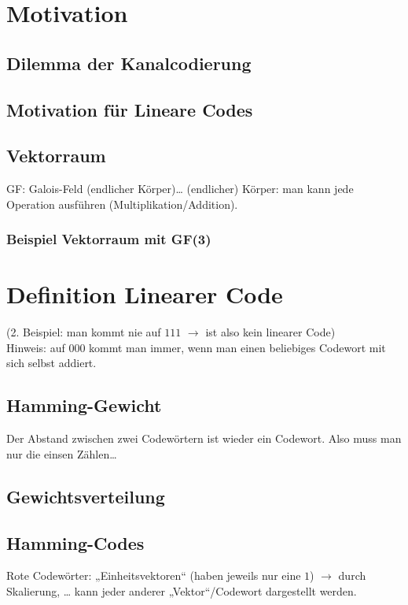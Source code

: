 \section{Motivation}
\subsection{Dilemma der Kanalcodierung}
\subsection{Motivation für Lineare Codes}
\subsection{Vektorraum}
GF: Galois-Feld (endlicher Körper)… (endlicher) Körper: man kann jede Operation ausführen (Multiplikation/Addition).
\subsubsection*{Beispiel Vektorraum mit GF(3)}

\section{Definition Linearer Code}
(2. Beispiel: man kommt nie auf $111$ $\to$ ist also kein linearer Code)\\
Hinweis: auf $000$ kommt man immer, wenn man einen beliebiges Codewort mit sich selbst addiert.
\subsection{Hamming-Gewicht}
Der Abstand zwischen zwei Codewörtern ist wieder ein Codewort. Also muss man nur die einsen Zählen…
\subsection{Gewichtsverteilung}
\subsection{Hamming-Codes}
Rote Codewörter: „Einheitsvektoren“ (haben jeweils nur eine $1$) $\to$ durch Skalierung, … kann jeder anderer „Vektor“/Codewort dargestellt werden.
